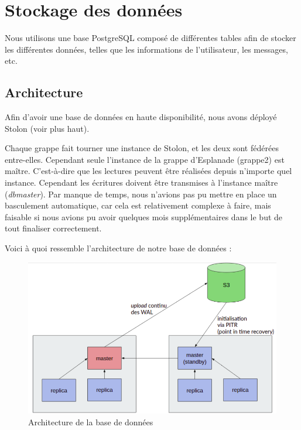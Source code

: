 \section{Stockage des données}

Nous utilisons une base PostgreSQL composé de différentes tables afin de
stocker les différentes données, telles que les informations de
l'utilisateur, les messages, etc.


\subsection{Architecture}

Afin d'avoir une base de données en haute disponibilité, nous avons
déployé Stolon (voir plus haut).

Chaque grappe fait tourner une instance de Stolon, et les deux sont
fédérées entre-elles. Cependant seule l'instance de la grappe d'Esplanade
(grappe2) est maître. C'est-à-dire que les lectures peuvent être
réalisées depuis n'importe quel instance. Cependant les écritures
doivent être transmises à l'instance maître (\textit{dbmaster}). Par
manque de temps, nous n'avions pas pu mettre en place un basculement
automatique, car cela est relativement complexe à faire, mais faisable
si nous avions pu avoir quelques mois supplémentaires dans le but de
tout finaliser correctement.

Voici à quoi ressemble l'architecture de notre base de données :

\begin{figure}[h]
  \caption{\label{db-arch} Architecture de la base de données}
  \includegraphics[width=15cm]{images/database-arch}
\end{figure}


